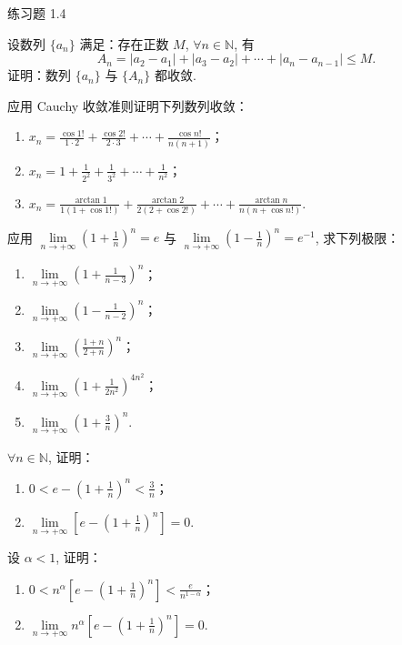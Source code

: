 \begin{exblock}{练习题 1.4}
\item 设数列 $\{a_{n}\}$ 满足：存在正数 $M$, $\forall n \in \mathbb{N}$, 有
\[
A_{n} = |a_{2}-a_{1}| + |a_{3}-a_{2}| + \cdots + |a_{n}-a_{n-1}| \leqslant M.
\]
证明：数列 $\{a_{n}\}$ 与 $\{A_{n}\}$ 都收敛.

\item 应用 Cauchy 收敛准则证明下列数列收敛：
\begin{enumerate}
\item $x_{n} = \frac{\cos 1!}{1 \cdot 2} + \frac{\cos 2!}{2 \cdot 3} + \cdots + \frac{\cos n!}{n(n+1)}$；
\item $x_{n} = 1 + \frac{1}{2^{2}} + \frac{1}{3^{2}} + \cdots + \frac{1}{n^{2}}$；
\item $x_{n} = \frac{\arctan 1}{1(1+\cos 1!)} + \frac{\arctan 2}{2(2+\cos 2!)} + \cdots + \frac{\arctan n}{n(n+\cos n!)}$.
\end{enumerate}

\item 应用 $\lim\limits_{n\to+\infty}\left(1+\frac{1}{n}\right)^n = e$ 与 $\lim\limits_{n\to+\infty}\left(1-\frac{1}{n}\right)^n = e^{-1}$, 求下列极限：
\begin{enumerate}
\item $\lim\limits_{n\to+\infty}\left(1 + \frac{1}{n-3}\right)^{n}$；
\item $\lim\limits_{n\to+\infty}\left(1 - \frac{1}{n-2}\right)^{n}$；
\item $\lim\limits_{n\to+\infty}\left(\frac{1+n}{2+n}\right)^{n}$；
\item $\lim\limits_{n\to+\infty}\left(1 + \frac{1}{2n^{2}}\right)^{4n^{2}}$；
\item $\lim\limits_{n \to +\infty} \left(1 + \frac{3}{n}\right)^n$.
\end{enumerate}

\item $\forall n \in \mathbb{N}$, 证明：
\begin{enumerate}
\item $0 < e - \left(1 + \frac{1}{n}\right)^n < \frac{3}{n}$；
\item $\lim\limits_{n \to +\infty} \left[e - \left(1 + \frac{1}{n}\right)^n\right] = 0$.
\end{enumerate}

\item 设 $\alpha < 1$, 证明：
\begin{enumerate}
\item $0 < n^{\alpha} \left[ e - \left( 1 + \frac{1}{n} \right)^{n} \right] < \frac{e}{n^{1 - \alpha}}$；
\item $\lim\limits_{n\to+\infty}n^{\alpha}\left[e - \left(1 + \frac{1}{n}\right)^n\right] = 0$.
\end{enumerate}


\end{exblock}
